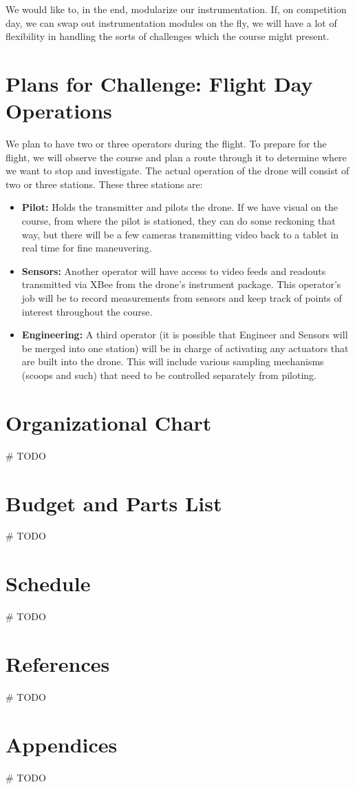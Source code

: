 We would like to, in the end, modularize our instrumentation. If, on competition day, we can swap out instrumentation modules on the fly, we will have a lot of flexibility in handling the sorts of challenges which the course might present.

\section{Plans for Challenge: Flight Day Operations}

We plan to have two or three operators during the flight. To prepare for the flight, we will observe the course and plan a route through it to determine where we want to stop and investigate. The actual operation of the drone will consist of two or three stations. These three stations are:

\begin{itemize}
\item \textbf{Pilot:} Holds the transmitter and pilots the drone. If we have visual on the course, from where the pilot is stationed, they can do some reckoning that way, but there will be a few cameras transmitting video back to a tablet in real time for fine maneuvering.
\item \textbf{Sensors:} Another operator will have access to video feeds and readouts transmitted via XBee from the drone’s instrument package. This operator’s job will be to record measurements from sensors and keep track of points of interest throughout the course.
\item \textbf{Engineering:} A third operator (it is possible that Engineer and Sensors will be merged into one station) will be in charge of activating any actuators that are built into the drone. This will include various sampling mechanisms (scoops and such) that need to be controlled separately from piloting.
\end{itemize}

\section{Organizational Chart}

\# TODO

\section{Budget and Parts List}

\# TODO

\section{Schedule}

\# TODO

\section{References}

\# TODO

\section{Appendices}

\# TODO

